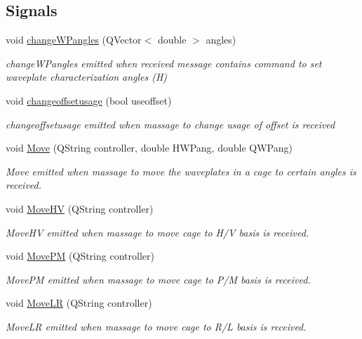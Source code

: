 \subsection*{Signals}
\begin{DoxyCompactItemize}
\item 
void \hyperlink{classUDPlistener_a6b7ee954a2af1aa98c6963f6ae266bc3}{change\+W\+Pangles} (Q\+Vector$<$ double $>$ angles)
\begin{DoxyCompactList}\small\item\em change\+W\+Pangles emitted when received message contains command to set waveplate characterization angles (\textquotesingle{}H\textquotesingle{}) \end{DoxyCompactList}\item 
void \hyperlink{classUDPlistener_abc9c9ae6f1371e6b55d9631ba00743c3}{changeoffsetusage} (bool useoffset)
\begin{DoxyCompactList}\small\item\em changeoffsetusage emitted when massage to change usage of offset is received \end{DoxyCompactList}\item 
void \hyperlink{classUDPlistener_a03cb7a923fb064f41395f8db9409e511}{Move} (Q\+String controller, double H\+W\+Pang, double Q\+W\+Pang)
\begin{DoxyCompactList}\small\item\em Move emitted when massage to move the waveplates in a cage to certain angles is received. \end{DoxyCompactList}\item 
void \hyperlink{classUDPlistener_a3d16ae857b48ba56257008a008b4e6ee}{Move\+HV} (Q\+String controller)
\begin{DoxyCompactList}\small\item\em Move\+HV emitted when massage to move cage to H/V basis is received. \end{DoxyCompactList}\item 
void \hyperlink{classUDPlistener_a3e3521c57796737bb229eeadb2f2fdfe}{Move\+PM} (Q\+String controller)
\begin{DoxyCompactList}\small\item\em Move\+PM emitted when massage to move cage to P/M basis is received. \end{DoxyCompactList}\item 
void \hyperlink{classUDPlistener_aefb57eacf9148d294952db636eefa9ac}{Move\+LR} (Q\+String controller)
\begin{DoxyCompactList}\small\item\em Move\+LR emitted when massage to move cage to R/L basis is received. \end{DoxyCompactList}\end{DoxyCompactItemize}
